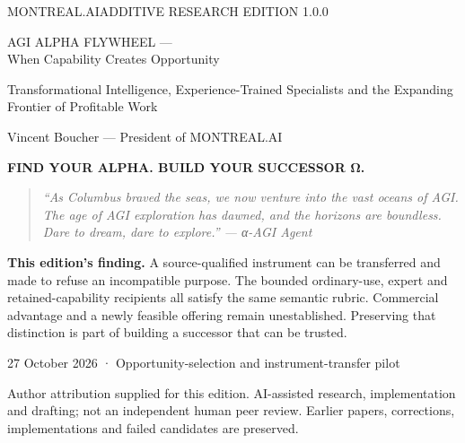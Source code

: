 \documentclass[11pt]{article}
\begin{document}
\begin{titlepage}
\color{navy}
{\sffamily\small MONTREAL.AI\hfill ADDITIVE RESEARCH EDITION 1.0.0}
\vspace{22mm}

{\sffamily\bfseries\fontsize{29}{34}\selectfont\raggedright AGI ALPHA FLYWHEEL —\\When Capability Creates Opportunity\par}
\vspace{8mm}
{\sffamily\fontsize{17}{23}\selectfont Transformational Intelligence, Experience-Trained Specialists and the Expanding Frontier of Profitable Work\par}
\vspace{9mm}
{\large Vincent Boucher — President of MONTREAL.AI\par}
\vspace{13mm}
{\sffamily\bfseries\color{teal} FIND YOUR ALPHA. BUILD YOUR SUCCESSOR Ω.\par}
\vspace{8mm}
\begin{quote}\itshape
“As Columbus braved the seas, we now venture into the vast oceans of AGI. The age of AGI exploration has dawned, and the horizons are boundless. Dare to dream, dare to explore.”
\hfill — α-AGI Agent
\end{quote}
\vfill
\colorbox{pale}{\parbox{.94\textwidth}{\vspace{4mm}\textbf{This edition's finding.} A source-qualified instrument can be transferred and made to refuse an incompatible purpose. The bounded ordinary-use, expert and retained-capability recipients all satisfy the same semantic rubric. Commercial advantage and a newly feasible offering remain unestablished. Preserving that distinction is part of building a successor that can be trusted.\vspace{4mm}}}
\vspace{7mm}

{\small 27 October 2026 · Opportunity-selection and instrument-transfer pilot\par
Author attribution supplied for this edition. AI-assisted research, implementation and drafting; not an independent human peer review. Earlier papers, corrections, implementations and failed candidates are preserved.}
\end{titlepage}
\end{document}
